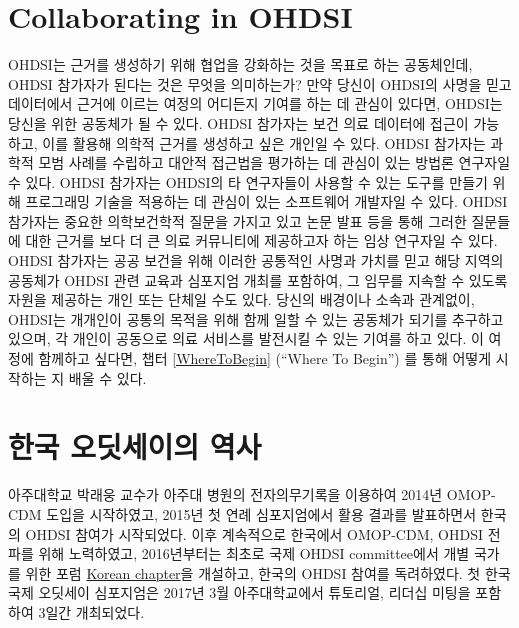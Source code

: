 \documentclass[11pt]{book}
\theoremstyle{definition}
\theoremstyle{definition}
\theoremstyle{definition}
\theoremstyle{remark}
\begin{document}
\section{Collaborating in OHDSI}\label{collaborating-in-ohdsi}

OHDSI는 근거를 생성하기 위해 협업을 강화하는 것을 목표로 하는
공동체인데, OHDSI 참가자가 된다는 것은 무엇을 의미하는가? 만약 당신이
OHDSI의 사명을 믿고 데이터에서 근거에 이르는 여정의 어디든지 기여를 하는
데 관심이 있다면, OHDSI는 당신을 위한 공동체가 될 수 있다. OHDSI
참가자는 보건 의료 데이터에 접근이 가능하고, 이를 활용해 의학적 근거를
생성하고 싶은 개인일 수 있다. OHDSI 참가자는 과학적 모범 사례를 수립하고
대안적 접근법을 평가하는 데 관심이 있는 방법론 연구자일 수 있다. OHDSI
참가자는 OHDSI의 타 연구자들이 사용할 수 있는 도구를 만들기 위해
프로그래밍 기술을 적용하는 데 관심이 있는 소프트웨어 개발자일 수 있다.
OHDSI 참가자는 중요한 의학보건학적 질문을 가지고 있고 논문 발표 등을
통해 그러한 질문들에 대한 근거를 보다 더 큰 의료 커뮤니티에 제공하고자
하는 임상 연구자일 수 있다. OHDSI 참가자는 공공 보건을 위해 이러한
공통적인 사명과 가치를 믿고 해당 지역의 공동체가 OHDSI 관련 교육과
심포지엄 개최를 포함하여, 그 임무를 지속할 수 있도록 자원을 제공하는
개인 또는 단체일 수도 있다. 당신의 배경이나 소속과 관계없이, OHDSI는
개개인이 공통의 목적을 위해 함께 일할 수 있는 공동체가 되기를 추구하고
있으며, 각 개인이 공동으로 의료 서비스를 발전시킬 수 있는 기여를 하고
있다. 이 여정에 함께하고 싶다면, 챕터 \ref{WhereToBegin} (``Where To
Begin'') 를 통해 어떻게 시작하는 지 배울 수 있다.

\section{한국 오딧세이의 역사}\label{--}

아주대학교 박래웅 교수가 아주대 병원의 전자의무기록을 이용하여 2014년
OMOP-CDM 도입을 시작하였고, 2015년 첫 연례 심포지엄에서 활용 결과를
발표하면서 한국의 OHDSI 참여가 시작되었다. 이후 계속적으로 한국에서
OMOP-CDM, OHDSI 전파를 위해 노력하였고, 2016년부터는 최초로 국제 OHDSI
committee에서 개별 국가를 위한 포럼
\href{http://forums.ohdsi.org/c/For-collaborators-wishing-to-communicate-in-Korean}{Korean
chapter}을 개설하고, 한국의 OHDSI 참여를 독려하였다. 첫 한국 국제
오딧세이 심포지엄은 2017년 3월 아주대학교에서 튜토리얼, 리더십 미팅을
포함하여 3일간 개최되었다.
\end{document}
